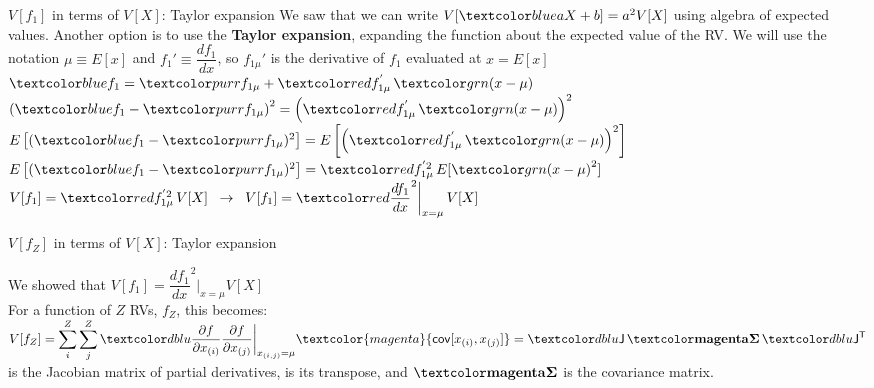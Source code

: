 \documentclass[10pt,sans,english,compress,xcolor=dvipsnames]{beamer}
\begin{document}
\begin{frame}{$V[f_1]$ in terms of $V[X]$: Taylor expansion}
\footnotesize
We saw that we can write $V[\bbl{aX+b}] = a^2V[X]$ using algebra of expected values. Another option is to use the \textbf{Taylor expansion}, expanding the function about the expected value of the RV. We will use the notation $\mu \equiv E[x]$ and $f_{1}' \equiv \dfrac{df_1}{dx}$, so $f_{1\mu}' $ is the derivative of $f_1$ evaluated at $x=E[x]$\\[1ex]

\footnotesize
$\bbl{f_1} = \purp{f_{1\mu} } + \rbl{ f^{'}_{1\mu}}\, \gbl{(x - \mu) }$ \\[1ex]
$\left( \bbl{f_1} - \purp{f_{1\mu} } \right)^2 = \left( \rbl{f^{'}_{1\mu}}\, \gbl{(x - \mu) }\right)^2 $ \\[1ex]

$E\left[( \bbl{f_1}- \purp{f_{1\mu} } )^2\right] = E\left[ \left( \rbl{ f^{'}_{1\mu} }\, \gbl{(x - \mu) } \right)^2 \right]$ \\[1ex]
$E\left[( \bbl{f_1}- \purp{f_{1\mu} } )^2\right]  =  \rbl{f^{'2}_{1\mu}} \, E[ \gbl{(x - \mu) } ^2 ] $ \\[1ex]
$V[ f_1 ]  =  \rbl{f^{'2}_{1\mu}} \, V[X]\;\; \rightarrow\;\; V[ f_1 ]  =  \rbl{\dfrac{df_1}{dx}^2\bigg|_{x=\mu}}\, V[X]$\\[1ex]
\end{frame} 


\begin{frame}{$V[f_Z]$ in terms of $V[X]$: Taylor expansion}

We showed that $V[ f_1 ]  =  \dfrac{df_1}{dx}^2\bigg|_{x=\mu} V[X] $\\[1ex]

For a function of $Z$ RVs, $f_Z$, this becomes:\\

$V[ f_Z]  =  \displaystyle \sum\limits_i^Z \sum\limits_j^Z \blu{\dfrac{\partial f}{\partial x_{(i)} }  \dfrac{\partial f}{\partial x_{(j)} } \bigg|_{x_{(i,j)}=\mu}} \textcolor{magenta}{\mathsf{cov}[x_{(i)}, x_{(j)}]} =  \blu{\mathsf{J}}\, \covmat\, \blu{\mathsf{J^{T}}} $\\[1ex]

 is the Jacobian matrix of partial derivatives,  is its transpose, and $\covmat$ is the covariance matrix.\\
\end{frame} 
\end{document}
